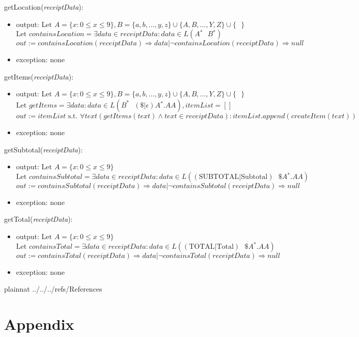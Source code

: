 \documentclass[12pt, titlepage]{article}
\begin{document}
\noindent getLocation(\textit{receiptData}):
\begin{itemize}
  \item output: $\text{Let } A=\{x : 0 \leq x \leq 9\}, B=\{a,b,\dots,y,z\}\cup\{A,B,\dots,Y,Z\}\cup\{\text{ }\}$ \\
                $\text{Let } containsLocation=\exists data \in receiptData : data \in L(A{}^\ast \text{ } B{}^\ast)$ \\
                $out := containsLocation(receiptData) \Rightarrow data | \neg containsLocation(receiptData) \Rightarrow null$
  \item exception: none
\end{itemize}

\noindent getItems(\textit{receiptData}):
\begin{itemize}
  \item output: $\text{Let } A=\{x : 0 \leq x \leq 9\}, B=\{a,b,\dots,y,z\}\cup\{A,B,\dots,Y,Z\}\cup\{\text{ }\}$ \\
                $\text{Let } getItems=\exists data : data \in L(B^\ast \text{ } (\$|\epsilon)A{}^\ast.AA), itemList=[]$ \\
                $out := itemList \text{ s.t. } \forall text(getItems(text) \land text \in receiptData) : itemList.append(createItem(text))$
  \item exception: none
\end{itemize}

\noindent getSubtotal(\textit{receiptData}):
\begin{itemize}
  \item output: $\text{Let } A=\{x : 0 \leq x \leq 9\}$ \\
                $\text{Let } containsSubtotal=\exists data \in receiptData : data \in L((\text{SUBTOTAL}|\text{Subtotal})\text{ }\$A{}^\ast.AA)$ \\
                $out := containsSubtotal(receiptData) \Rightarrow data | \neg containsSubtotal(receiptData) \Rightarrow null$
  \item exception: none
\end{itemize}

\noindent getTotal(\textit{receiptData}):
\begin{itemize}
  \item output: $\text{Let } A=\{x : 0 \leq x \leq 9\}$ \\
                $\text{Let } containsTotal=\exists data \in receiptData : data \in L((\text{TOTAL}|\text{Total})\text{ }\$A{}^\ast.AA)$ \\
                $out := containsTotal(receiptData) \Rightarrow data | \neg containsTotal(receiptData) \Rightarrow null$
  \item exception: none
\end{itemize}

 {plainnat}
 {../../../refs/References}

\newpage

\section{Appendix} \label{Appendix}

\end{document}
